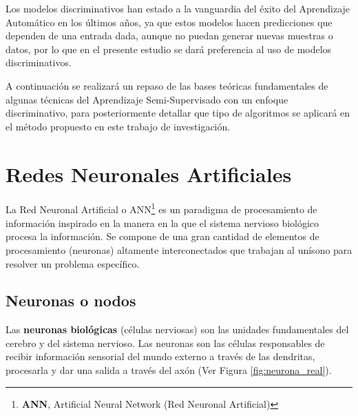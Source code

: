 \vspace{5mm} %

Los modelos discriminativos han estado a la vanguardia del éxito del Aprendizaje Automático en los \'{u}ltimos a\~{n}os, ya que estos modelos hacen predicciones que dependen de una entrada dada, aunque no puedan generar nuevas muestras o datos, por lo que en el presente estudio se dar\'{a} preferencia al uso de modelos discriminativos.

\vspace{5mm} %

A continuaci\'{o}n se realizar\'{a} un repaso de las bases te\'{o}ricas fundamentales de algunas t\'{e}cnicas del Aprendizaje Semi-Supervisado con un enfoque discriminativo, para posteriormente detallar que tipo de algoritmos se aplicar\'{a} en el m\'{e}todo propuesto en este trabajo de investigaci\'{o}n.

\section{Redes Neuronales Artificiales}

La Red Neuronal Artificial o ANN\footnote{\textbf{ANN}, Artificial Neural Network (Red Neuronal Artificial)} es un paradigma de procesamiento de informaci\'{o}n inspirado en la manera en la que el sistema nervioso biol\'{o}gico procesa la informaci\'{o}n. Se compone de una gran cantidad de elementos de procesamiento (neuronas) altamente interconectados que trabajan al un\'{i}sono para resolver un problema espec\'{i}fico.

\subsection{Neuronas o nodos}

Las \textbf{neuronas biol\'{o}gicas} (c\'{e}lulas nerviosas) son las unidades fundamentales del cerebro y del sistema nervioso. Las neuronas son las c\'{e}lulas responsables de recibir informaci\'{o}n sensorial del mundo externo a trav\'{e}s de las dendritas, procesarla y dar una salida a trav\'{e}s del ax\'{o}n (Ver Figura \ref{fig:neurona_real}). 

